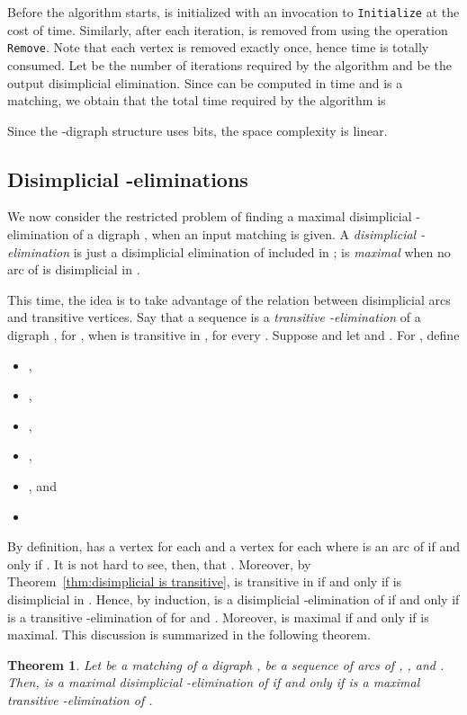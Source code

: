 \documentclass[a4paper,11pt]{article}
\newtheorem{theorem}{Theorem}
\begin{document}
Before the algorithm starts,  is initialized with an invocation to \texttt{Initialize} at the cost of  time.  Similarly, after each iteration,  is removed from  using the operation \texttt{Remove}.  Note that each vertex is removed exactly once, hence  time is totally consumed.   Let  be the number of iterations required by the algorithm and  be the output disimplicial elimination.  Since  can be computed in  time and  is a matching, we obtain that the total time required by the algorithm is

Since the -digraph structure uses  bits, the space complexity is linear.

\subsection{Disimplicial -eliminations}

We now consider the restricted problem of finding a maximal disimplicial -elimination of a digraph , when an input matching  is given.  A \emph{disimplicial -elimination} is just a disimplicial elimination  of  included in ;  is \emph{maximal} when no arc of  is disimplicial in .  

This time, the idea is to take advantage of the relation between disimplicial arcs and transitive vertices.  Say that a sequence  is a \emph{transitive -elimination} of a digraph , for , when  is transitive in , for every .  Suppose  and let  and .  For , define
\begin{itemize}
\item ,
\item ,
\item ,
\item , 
\item , and
\item 
\end{itemize}
By definition,  has a vertex  for each  and a vertex  for each  where  is an arc of  if and only if .  It is not hard to see, then, that .  Moreover, by Theorem~\ref{thm:disimplicial is transitive},  is transitive in  if and only if  is disimplicial in .  Hence, by induction,  is a disimplicial -elimination of  if and only if  is a transitive -elimination of  for  and .  Moreover,  is maximal if and only if  is maximal.  This discussion is summarized in the following theorem.

\begin{theorem}\label{thm:transitive elimination}
  Let  be a matching of a digraph ,  be a sequence of arcs of , , and .  Then,  is a maximal disimplicial -elimination of  if and only if  is a maximal transitive -elimination of . 
\end{theorem}
\end{document}
